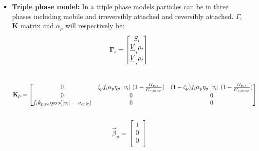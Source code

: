 \begin{itemize}
    \item \textbf{Triple phase model: } In a triple phase models particles can be in three phases including mobile and irreversibly attached and reversibly attached. $\Gamma$, $\textbf{K}$ matrix and $\alpha_p$ will respectively be: 
    \begin{equation}
    \label{eq:24}
    \vec{\Gamma}_i = 
    \begin{bmatrix} 
    S_i \\ 
    \sout{V}_i \rho_i \\
    \sout{V}_i \rho_i 
    \end{bmatrix}
    \end{equation}
    \\
    \noindent
    \begin{equation}
    \label{eq:25}
    \noindent
    \vec{K}_p = 
    \begin{bmatrix} 
    0 & \zeta_p f_i \alpha_p \eta_p \  |v_i| \ (1-\frac{G_{p,s}}{G_{s,max}}) & (1-\zeta_p) f_i \alpha_p \eta_p \  |v_i| \ (1-\frac{G_{p,s}}{G_{s,max}})\\ 
    0 & 0 & 0\\
    f_i k_{p,rel}  pos(|v_i|-v_{crit}) & 0 & 0\\
    \end{bmatrix}
    \end{equation}
    \\
    \begin{equation}
    \label{eq:26}
    \vec{\beta}_p = 
    \begin{bmatrix} 
    1 \\ 
    0 \\
    0 \\
    \end{bmatrix}
    \end{equation}
\end{itemize}
